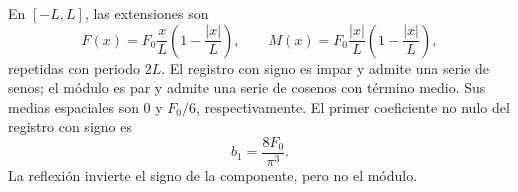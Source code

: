 En \([-L,L]\), las extensiones son
\[
F(x)=F_0\frac{x}{L}\left(1-\frac{|x|}{L}\right),\qquad
M(x)=F_0\frac{|x|}{L}\left(1-\frac{|x|}{L}\right),
\]
repetidas con periodo \(2L\). El registro con signo es impar y admite una serie de senos; el módulo es par y admite una serie de cosenos con término medio. Sus medias espaciales son \(0\) y \(F_0/6\), respectivamente. El primer coeficiente no nulo del registro con signo es
\[
b_1=\frac{8F_0}{\pi^3}.
\]
La reflexión invierte el signo de la componente, pero no el módulo.
